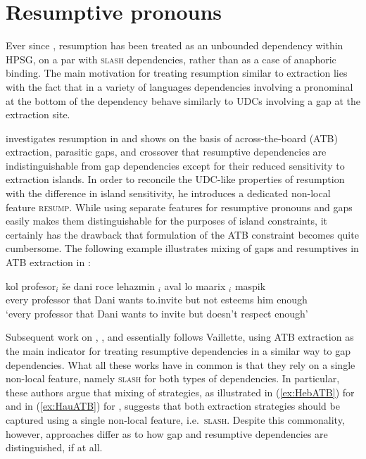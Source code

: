 \documentclass[output=paper
,notxmath 
 	        ,biblatex
                ,babelshorthands
                ,newtxmath
                ,draftmode
                ,colorlinks, citecolor=brown
]{langscibook}
\begin{document}
\section{Resumptive pronouns}
\label{sec:UDC:ResumptivePronouns}

Ever since \citet{Vaillette:01}, resumption has been treated as an
unbounded dependency within HPSG, on a par with \textsc{slash}
dependencies, rather than as a case of anaphoric binding. The main
motivation for treating resumption similar to extraction lies with the
fact that in a variety of languages dependencies involving a
pronominal at the bottom of the dependency behave similarly to UDCs
involving a gap at the extraction site.

\citet{Vaillette:01} investigates resumption in  and shows on
the basis of across-the-board (ATB) extraction, parasitic gaps, and
crossover that resumptive dependencies are indistinguishable from gap
dependencies except for their reduced sensitivity to extraction
islands. In order to reconcile the UDC-like properties of resumption
with the difference in island sensitivity, he introduces a dedicated
non-local feature \textsc{resump}. While using separate features for
resumptive pronouns and gaps easily makes them distinguishable for the
purposes of island constraints, it certainly has the drawback that
formulation of the ATB constraint becomes quite cumbersome.
The following example illustrates mixing of gaps and resumptives in
ATB extraction in : 

\begin{exe}
  \ex \label{ex:HebATB}{
\gll kol profesor$_i$ še dani roce lehazmin \trace{}$_i$ aval lo maarix $_i$ maspik\footnotemark\\
     every professor that Dani wants to.invite {} but not esteems him enough\\
\glt `every professor that Dani wants to invite but doesn't respect enough'
}
\end{exe}

\noindent
Subsequent work on  \citep{Taghvaipour2005a},  \citep{Crysmann:12}, and 
\citep{Borsley:13} essentially follows
Vaillette, using ATB extraction as the main indicator for treating
resumptive dependencies in a similar way to gap dependencies. What all these
works have in common is that they rely on a single non-local
feature, namely \textsc{slash} for both types of dependencies. In
particular, these authors argue that mixing of strategies, as
illustrated in (\ref{ex:HebATB}) for  and in (\ref{ex:HauATB})
for , suggests that both extraction
strategies should be captured using a single non-local feature,
i.e.\ \textsc{slash}. Despite this commonality, however, approaches
differ as to how gap and resumptive dependencies are distinguished, if
at all.
\end{document}
